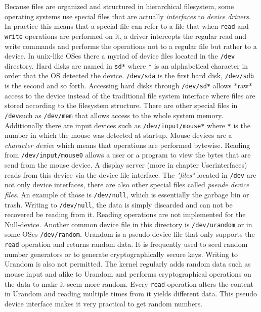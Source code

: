 Because files are organized and structured in hierarchical filesystem, some operating systems use special
files that are actually \textit{interfaces} to \textit{device drivers}. In practice this means that a special file can
refer to a file that when \texttt{read} and \texttt{write} operations are performed on it, a driver intercepts the regular
read and write commands and performs the operations not to a regular file but rather to a device. In unix-like
OSes there a myriad of device files located in the \texttt{/dev} directory. Hard disks are named in \texttt{sd*} where \texttt{*}
is an alphabetical character in order that the OS detected the device. \texttt{/dev/sda} is the first hard disk,
\texttt{/dev/sdb} is the second and so forth. Accessing hard disks through \texttt{/dev/sd*} allows *raw* access to the
device instead of the traditional file system interface where files are stored according to the filesystem
structure. There are other special files in \texttt{/dev}such as \texttt{/dev/mem} that allows access to the whole system
memory. Additionally there are input devices such as \texttt{/dev/input/mouse*} where \texttt{*} is the number in which the
mouse was detected at startup. Mouse devices are a \textit{character device} which means that operations are performed
bytewise. Reading from \texttt{/dev/input/mouse0} allows a user or a program to view the bytes that are send from the
mouse device. A display server (more in chapter Userinterfaces) reads from this device via the device file
interface. The \textit{"files"} located in \texttt{/dev} are not only device interfaces, there are also other special files called \textit{pseude device files}.
An example of those is \texttt{/dev/null}, which is essentially the garbage bin or trash. Writing to \texttt{/dev/null},
the data is simply discarded and can not be recovered be reading from it. Reading operations are not implemented for
the Null-device. Another common device file in this directory is \texttt{/dev/urandom} or in some OSes \texttt{/dev/random}. Urandom is a pseudo device file
that only supports the \texttt{read} operation and returns random data. It is frequently used to seed random number
generators or to generate cryptographically secure keys. Writing to Urandom is also not permitted. The kernel regularly
adds random data such as mouse input and alike to Urandom and performs cryptographical operations on the data to make
it seem more random. Every \texttt{read} operation alters the content in Urandom and reading multiple times from it yields
different data. This pseudo device interface makes it very practical to get random numbers.
